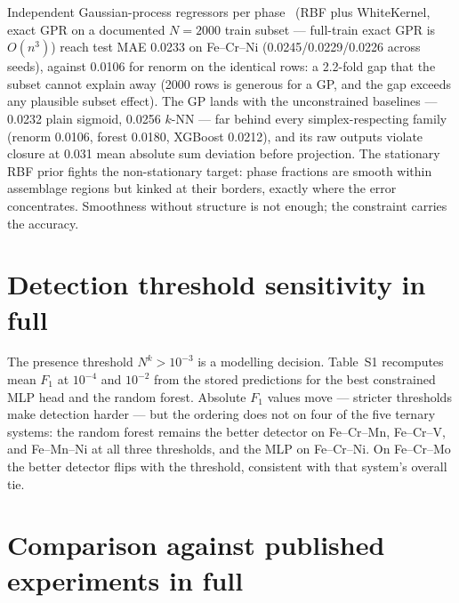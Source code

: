 \documentclass[11pt,a4paper]{article}
\newcommand{\Np}[1]{N^{#1}}
\begin{document}
Independent Gaussian-process regressors per phase~\citep{rasmussen2006gaussian}
(RBF plus WhiteKernel,
exact GPR on a documented $N{=}2000$ train subset --- full-train exact
GPR is $O(n^3)$) reach test MAE 0.0233 on Fe--Cr--Ni
(0.0245/0.0229/0.0226 across seeds), against 0.0106 for renorm on the
identical rows: a 2.2-fold gap that the subset cannot explain away (2000
rows is generous for a GP, and the gap exceeds any plausible subset
effect). The GP lands with the unconstrained baselines --- 0.0232
plain sigmoid, 0.0256 $k$-NN --- far behind every simplex-respecting
family (renorm 0.0106, forest 0.0180, XGBoost 0.0212), and its raw
outputs violate closure at 0.031 mean absolute sum deviation before
projection. The stationary RBF prior fights the non-stationary target:
phase fractions are smooth within assemblage regions but kinked at their
borders, exactly where the error concentrates. Smoothness without
structure is not enough; the constraint carries the accuracy.


\section{Detection threshold sensitivity in full}
\label{sec:si-threshold}

The presence threshold $\Np{k} > 10^{-3}$ is a modelling decision. Table~S1
recomputes mean $F_1$ at $10^{-4}$ and $10^{-2}$ from the stored
predictions for the best constrained MLP head and the random forest.
Absolute $F_1$ values move --- stricter thresholds make detection harder
--- but the ordering does not on four of the five ternary systems: the
random forest remains the better detector on Fe--Cr--Mn, Fe--Cr--V, and
Fe--Mn--Ni at all three thresholds, and the MLP on Fe--Cr--Ni. On
Fe--Cr--Mo the better detector flips with the threshold, consistent with
that system's overall tie.

\begin{table}[htbp]
\centering
\caption{Table S1. Sensitivity of phase-presence detection to the presence
threshold. Mean $F_1$ (three seeds; uncertainty in units of the last digit)
for the best constrained MLP head and the random forest at thresholds
$10^{-4}$, $10^{-3}$ (main-study default), and $10^{-2}$.}
\label{tab:si-threshold}
\small

\end{table}

\section{Comparison against published experiments in full}
\label{sec:si-anchor}
\end{document}
